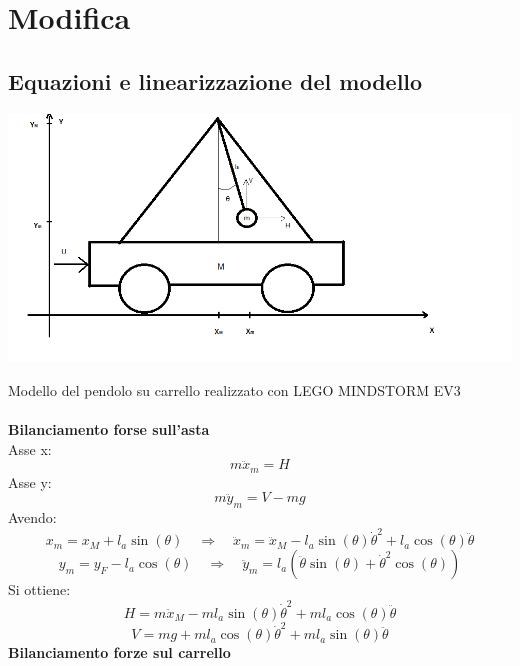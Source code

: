 \chapter{Modifica}
\section{Equazioni e linearizzazione del modello}
\begin{center}
	\includegraphics[scale=0.6]{pendolo.png}
\end{center}
Modello del pendolo su carrello realizzato con LEGO MINDSTORM EV3\\\\
\textbf{Bilanciamento forse sull'asta}\\
Asse x:
\begin{equation}
m\ddot{x}_m=H
\end{equation}
Asse y:
\begin{equation}
m\ddot{y}_m=V-mg
\end{equation}
Avendo:\\
\begin{equation}
x_m = x_M+l_a\sin(\theta) \quad \Rightarrow \quad \ddot{x}_m=\ddot{x}_M-l_a\sin(\theta)\dot{\theta}^2+l_a\cos(\theta)\ddot{\theta}
\end{equation}
\begin{equation}
y_m=y_F-l_a\cos(\theta) \quad \Rightarrow \quad \ddot{y}_m=l_a(\ddot{\theta}\sin(\theta)+\dot{\theta}^2\cos(\theta))
\end{equation}
Si ottiene:
\begin{equation}\label{H}
H=m\ddot{x}_M-ml_a\sin(\theta)\dot{\theta}^2+ml_a\cos(\theta)\ddot{\theta}
\end{equation}
\begin{equation}\label{V}
V=mg+ml_a\cos(\theta)\dot{\theta}^2+ml_a\sin(\theta)\ddot{\theta}
\end{equation}
\textbf{Bilanciamento forze sul carrello}
